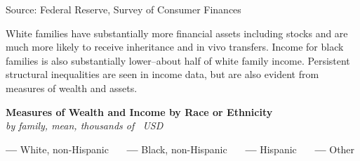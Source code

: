 \documentclass{report}
\begin{document}
{\begin{minipage}{0.76\textwidth}
\footnotesize{Source: Federal Reserve, Survey of Consumer Finances}
\vspace{1.5mm}

\small White families have substantially more financial assets including stocks and are much more likely to receive inheritance and in vivo transfers. Income for black families is also substantially lower--about half of white family income. Persistent structural inequalities are seen in income data, but are also evident from measures of wealth and assets.
\vspace{0.5mm}

\normalsize \textbf{Measures of Wealth and Income by Race or Ethnicity}\\
\footnotesize{\textit{by family, mean, thousands of \unskip \ USD}}
\vspace{-0.5mm}

\Large{\color{red!80!white}\textbf{---}} \footnotesize{White, non-Hispanic} \ \ \ \Large{\color{blue!80!black}\textbf{---}} \footnotesize{Black, non-Hispanic} \ \ \ \Large{\color{magenta!60!violet}\textbf{---}} \footnotesize{Hispanic} \ \ \ \Large{\color{black!40!white}\textbf{---}} \footnotesize{Other}
\end{minipage}
\vspace{-0.5mm}

}
\end{document}
